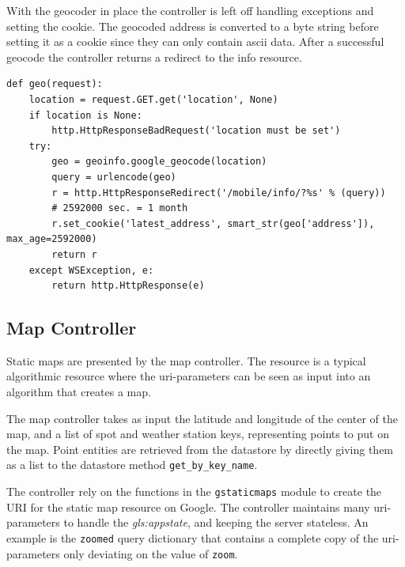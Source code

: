 With the geocoder in place the controller is left off handling exceptions and
setting the cookie. The geocoded address is converted to a byte string before
setting it as a cookie since they can only contain ascii data. After a successful
geocode the controller returns a redirect to the info resource.

\begin{lstlisting}[caption=Geo controller, label=lst:geo_controller]
  def geo(request):
    location = request.GET.get('location', None)
    if location is None:
        http.HttpResponseBadRequest('location must be set')
    try:
        geo = geoinfo.google_geocode(location)
        query = urlencode(geo)
        r = http.HttpResponseRedirect('/mobile/info/?%s' % (query))
        # 2592000 sec. = 1 month
        r.set_cookie('latest_address', smart_str(geo['address']), max_age=2592000)
        return r
    except WSException, e:
        return http.HttpResponse(e)
\end{lstlisting}

\subsection{Map Controller}
Static maps are presented by the map controller. The resource is a typical
algorithmic resource where the uri-parameters can be seen as input into an
algorithm that creates a map. 

The map controller takes as input the latitude and longitude of the center of the
map, and a list of spot and weather station keys, representing points to put on
the map. Point entities are retrieved from the datastore by directly giving them
as a list to the datastore method \verb|get_by_key_name|.

The controller rely on the functions in the \verb|gstaticmaps| module to create
the URI for the static map resource on Google. The controller maintains many
uri-parameters to handle the \textit{\gls{gls:appstate}}, and keeping the server
stateless. An example is the \verb|zoomed| query dictionary that contains a
complete copy of the uri-parameters only deviating on the value of \verb|zoom|.

